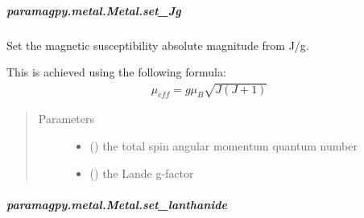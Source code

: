 \documentclass[a4paper,10pt,english]{sphinxmanual}
\begin{document}
\begin{fulllineitems}
\begin{fulllineitems}
\begin{fulllineitems}
\end{fulllineitems}



\subparagraph{paramagpy.metal.Metal.set\_Jg}
\label{\detokenize{reference/generated/paramagpy.metal.Metal.set_Jg:paramagpy-metal-metal-set-jg}}\label{\detokenize{reference/generated/paramagpy.metal.Metal.set_Jg::doc}}

\begin{fulllineitems}
\label{\detokenize{reference/generated/paramagpy.metal.Metal.set_Jg:paramagpy.metal.Metal.set_Jg}}
Set the magnetic susceptibility absolute magnitude from J/g.

This is achieved using the following formula:
\begin{equation*}
\begin{split}\mu_{eff}=g\mu_B\sqrt{J(J+1)}\end{split}
\end{equation*}\begin{quote}\begin{description}
\item[{Parameters}] \leavevmode\begin{itemize}
\item {} 
 () \textendash{} the total spin angular momentum quantum number

\item {} 
 (\sphinxstyleliteralemphasis{\sphinxupquote{, }}) \textendash{} the Lande g-factor

\end{itemize}

\end{description}\end{quote}

\end{fulllineitems}



\subparagraph{paramagpy.metal.Metal.set\_lanthanide}
\label{\detokenize{reference/generated/paramagpy.metal.Metal.set_lanthanide:paramagpy-metal-metal-set-lanthanide}}\label{\detokenize{reference/generated/paramagpy.metal.Metal.set_lanthanide::doc}}


\end{fulllineitems}
\end{fulllineitems}
\end{document}
